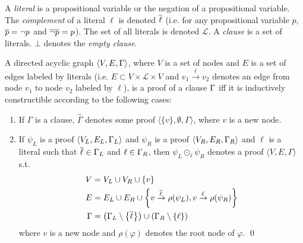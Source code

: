 \documentclass{llncs}
\begin{document}
A \emph{literal} is a propositional variable or the negation of a propositional variable. The
\emph{complement} of a literal $\ell$ is denoted $\overline{\ell}$ (i.e. for any propositional variable $p$,
$\overline{p} = \neg p$ and $\overline{\neg p} = p$). The set of all literals is denoted $\mathcal{L}$. A
\emph{clause} is a set of literals. $\bot$ denotes the \emph{empty clause}.


\newcommand{\axiom}[1]{\widehat{#1}}
\newcommand{\n}{v}
\newcommand{\raiz}[1]{\rho(#1)}

\begin{definition}[Proof] 
\label{def:proof}
A directed acyclic graph $\langle V, E, \Gamma \rangle$, where $V$ is a set of nodes and $E$ is a
set of edges labeled by literals (i.e. $E \subset V \times \mathcal{L} \times V$ and $\n_1
\xrightarrow{\ell} \n_2$ denotes an edge from node $\n_1$ to node $\n_2$ labeled by $\ell$), is a
proof of a clause $\Gamma$ iff it is inductively constructible according to the following cases:
%
\begin{enumerate}
  \item If $\Gamma$ is a clause, $\axiom{\Gamma}$ denotes some proof $\langle \{ \n \}, \emptyset ,
    \Gamma \rangle$, where $\n$ is a new node.
  \item If $\psi_L$ is a proof $\langle V_L, E_L, \Gamma_L \rangle$ and
    $\psi_R$ is a proof $\langle V_R, E_R, \Gamma_R \rangle$ and $\ell$ is a literal such that
    $\overline{\ell} \in \Gamma_L$ and $\ell \in \Gamma_R$, then
    $\psi_L \odot_\ell \psi_R$ denotes a proof $\langle V, E, \Gamma \rangle$ s.t.
    \begin{align*}
      V &= V_L \cup V_R \cup \{\n \} \\
      E &= E_L \cup E_R \cup
                    \left\{ \n \xrightarrow{\dual{\ell}} \raiz{\psi_L}, \n \xrightarrow{\ell} \raiz{\psi_R} \right\} \\
     \Gamma &= \left( \clause_L \setminus \left\{ \dual{\ell} \right\} \right) \cup \left( \clause_R
                    \setminus \left\{ \ell \right\} \right)
    \end{align*}
    where $\n$ is a new node and $\raiz{\varphi}$ denotes the root node of $\varphi$.
  \qed
\end{enumerate}
\end{definition}


\newcommand{\Vertices}[1]{V_{#1}}
\newcommand{\Edges}[1]{E_{#1}}
\newcommand{\Conclusion}[1]{\clause_{#1}}
\newcommand{\Premises}[2]{P_{#1}^{#2}}
\newcommand{\Children}[2]{C_{#1}^{#2}}
\newcommand{\Axioms}[1]{A_{#1}}
\end{document}
